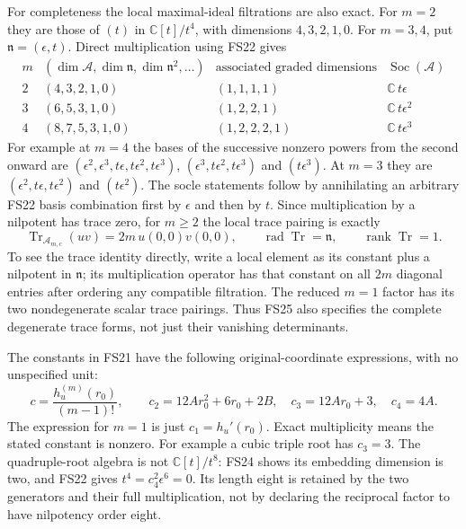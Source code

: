 \documentclass[11pt]{article}
\newcommand{\C}{\mathbb C}
\providecommand{\Tr}{\operatorname{Tr}}
\providecommand{\Tr}{\operatorname{Tr}}
\begin{document}
For completeness the local maximal-ideal filtrations are
also exact. For $m=2$ they are those of $(t)$ in
$\C[t]/t^4$, with dimensions $4,3,2,1,0$.
For $m=3,4$, put $\mathfrak n=(\epsilon,t)$. Direct
multiplication using FS22 gives
\begin{equation}
\begin{array}{c|c|c|c}
m&(\dim\mathcal A,\dim\mathfrak n,\dim\mathfrak n^2,\ldots)
 &\text{associated graded dimensions}&\operatorname{Soc}(\mathcal A)\\\hline
2&(4,3,2,1,0)&(1,1,1,1)&\C\,t\epsilon\\
3&(6,5,3,1,0)&(1,2,2,1)&\C\,t\epsilon^2\\
4&(8,7,5,3,1,0)&(1,2,2,2,1)&\C\,t\epsilon^3
\end{array}
\tag{FS24}
\end{equation}
For example at $m=4$ the bases of the successive nonzero
powers from the second onward are
$(\epsilon^2,\epsilon^3,t\epsilon,t\epsilon^2,t\epsilon^3)$,
$(\epsilon^3,t\epsilon^2,t\epsilon^3)$ and $(t\epsilon^3)$.
At $m=3$ they are $(\epsilon^2,t\epsilon,t\epsilon^2)$
and $(t\epsilon^2)$. The socle statements follow by
annihilating an arbitrary FS22 basis combination first by
$\epsilon$ and then by $t$.
Since multiplication by a nilpotent has trace zero,
for $m\ge2$ the local trace pairing is exactly
\begin{equation}
\Tr_{\mathcal A_{m,c}}(uv)=2m\,u(0,0)v(0,0),\qquad
\operatorname{rad}\Tr=\mathfrak n,\qquad
\operatorname{rank}\Tr=1 .
\tag{FS25}
\end{equation}
To see the trace identity directly, write a local element
as its constant plus a nilpotent in $\mathfrak n$; its
multiplication operator has that constant on all $2m$
diagonal entries after ordering any compatible filtration.
The reduced $m=1$ factor has its two nondegenerate scalar
trace pairings. Thus FS25 also specifies the complete
degenerate trace forms, not just their vanishing determinants.

The constants in FS21 have the following original-coordinate
expressions, with no unspecified unit:
\begin{equation}
c=\frac{h_u^{(m)}(r_0)}{(m-1)!},\qquad
c_2=12Ar_0^2+6r_0+2B,\quad
c_3=12Ar_0+3,\quad c_4=4A .
\tag{FS26}
\end{equation}
The expression for $m=1$ is just $c_1=h_u'(r_0)$.
Exact multiplicity means the stated constant is nonzero.
For example a cubic triple root has $c_3=3$.
The quadruple-root algebra is not $\C[t]/t^8$:
FS24 shows its embedding dimension is two, and FS22 gives
$t^4=c_4^2\epsilon^6=0$. Its length eight is retained by
the two generators and their full multiplication, not by
declaring the reciprocal factor to have nilpotency order eight.
\end{document}
